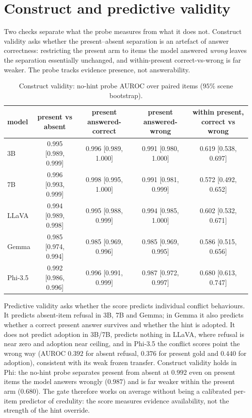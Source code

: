\documentclass[10pt]{article}
\begin{document}
\section{Construct and predictive validity}
\label{app:validity}

Two checks separate what the probe measures from what it does not. Construct validity asks whether the present--absent separation is an artefact of answer correctness: restricting the present arm to items the model answered \emph{wrong} leaves the separation essentially unchanged, and within-present correct-vs-wrong is far weaker. The probe tracks evidence presence, not answerability.

\begin{table}[h]
\centering
\small
\caption{Construct validity: no-hint probe AUROC over paired items ($95\%$ scene bootstrap).}
\label{tab:construct}
\setlength{\tabcolsep}{4pt}
\begin{tabular}{lcccc}
\toprule
model & present vs absent & present answered-correct & present answered-wrong & within present, correct vs wrong \\
\midrule
3B & 0.995 [0.989, 0.999] & 0.996 [0.989, 1.000] & 0.991 [0.980, 1.000] & 0.619 [0.538, 0.697] \\
7B & 0.996 [0.993, 0.999] & 0.998 [0.995, 1.000] & 0.991 [0.981, 0.999] & 0.572 [0.492, 0.652] \\
LLaVA & 0.994 [0.989, 0.998] & 0.995 [0.988, 0.999] & 0.994 [0.985, 1.000] & 0.602 [0.532, 0.671] \\
Gemma & 0.985 [0.974, 0.994] & 0.985 [0.969, 0.996] & 0.985 [0.969, 0.995] & 0.586 [0.515, 0.656] \\
Phi-3.5 & 0.992 [0.986, 0.996] & 0.996 [0.991, 0.999] & 0.987 [0.972, 0.997] & 0.680 [0.613, 0.747] \\
\bottomrule
\end{tabular}
\end{table}

Predictive validity asks whether the score predicts individual conflict behaviours. It predicts absent-item refusal in 3B, 7B and Gemma; in Gemma it also predicts whether a correct present answer survives and whether the hint is adopted. It does not predict adoption in 3B/7B, predicts nothing in LLaVA, where refusal is near zero and adoption near ceiling, and in Phi-3.5 the conflict scores point the wrong way (AUROC $0.392$ for absent refusal, $0.376$ for present gold and $0.440$ for adoption), consistent with its weak frozen transfer. Construct validity holds in Phi: the no-hint probe separates present from absent at $0.992$ even on present items the model answers wrongly ($0.987$) and is far weaker within the present arm ($0.680$). The gate therefore works on average without being a calibrated per-item predictor of credulity: the score measures evidence availability, not the strength of the hint override.
\end{document}
